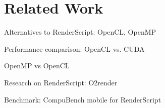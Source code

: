 \section{Related Work}

Alternatives to RenderScript: OpenCL, OpenMP

Performance comparison: OpenCL vs. CUDA \cite{fang2011comprehensive}
\cite{weber2011comparing} \cite{van2011correlating}
\cite{vassilev2010comparison} \cite{amorim2009comparing}
\cite{karimi2010performance} 


OpenMP vs OpenCL \cite{shen2012performance}


Research on RenderScript: O2render \cite{yang2012o2render}

Benchmark: CompuBench mobile for RenderScript \cite{compuBenchMobile}


